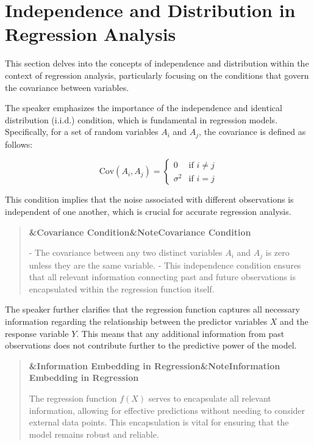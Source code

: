 \documentclass[a4paper]{article}
\newcommand{\boxheading}[1]{%
  \par\smallskip
  \noindent\textbf{\ifx&#1&Note\else#1\fi}\par
  \smallskip
}
\newenvironment{exbox}[1][]{%
  \begin{quote}\color{brown!70!black}\boxheading{#1}\normalcolor
}{\end{quote}}
\newenvironment{rembox}[1][]{%
  \begin{quote}\color{black!70}\boxheading{#1}\normalcolor
}{\end{quote}}
\begin{document}
\section{Independence and Distribution in Regression Analysis}
This section delves into the concepts of independence and distribution within the context of regression analysis, particularly focusing on the conditions that govern the covariance between variables.

The speaker emphasizes the importance of the independence and identical distribution (i.i.d.) condition, which is fundamental in regression models. Specifically, for a set of random variables \( A_i \) and \( A_j \), the covariance is defined as follows:

\begin{equation}
\text{Cov}(A_i, A_j) = 
\begin{cases} 
0 & \text{if } i \neq j \\ 
\sigma^2 & \text{if } i = j 
\end{cases}
\end{equation}

This condition implies that the noise associated with different observations is independent of one another, which is crucial for accurate regression analysis.

\begin{rembox}[Covariance Condition]
- The covariance between any two distinct variables \( A_i \) and \( A_j \) is zero unless they are the same variable.
- This independence condition ensures that all relevant information connecting past and future observations is encapsulated within the regression function itself.
\end{rembox}

The speaker further clarifies that the regression function captures all necessary information regarding the relationship between the predictor variables \( X \) and the response variable \( Y \). This means that any additional information from past observations does not contribute further to the predictive power of the model.

\begin{exbox}[Information Embedding in Regression]
The regression function \( f(X) \) serves to encapsulate all relevant information, allowing for effective predictions without needing to consider external data points. This encapsulation is vital for ensuring that the model remains robust and reliable.
\end{exbox}
\end{document}
